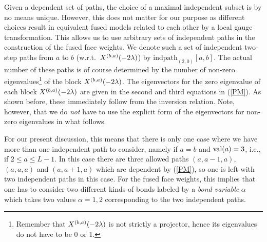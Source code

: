 Given a dependent set of paths, the choice of a maximal independent subset
is by no means unique. However, this does not matter for our purpose as
different choices result in equivalent fused models related to each other by a
local gauge transformation. This allows us to use arbitrary sets of independent
paths in the construction of the fused face weights. We denote such a set of
independent two-step paths from $a$ to $b$ (w.r.t.\ $X^{(b,a)}(-2\lambda)$)
by $\mbox{indpath}_{(2,0)}[a,b]$. The actual number of these paths is of course
determined by the number of non-zero eigenvalues\footnote{Remember that
$X^{(b,a)}(-2\lambda)$ is not strictly a projector, hence its eigenvalues do not
have to be 0 or 1.} of the  block $X^{(b,a)}(-2\lambda)$. The eigenvectors for
the zero eigenvalue of each block  $X^{(b,a)}(-2\lambda)$ are given in the second
and third equations in (\ref{PM}). As shown before, these immediately follow
from the inversion relation. Note, however, that we do {\em not} have to use
the explicit form of the eigenvectors for non-zero eigenvalues in what follows.

For our present discussion, this means that there is only one case where
we have more than one independent path to consider, namely if $a=b$ and
$\mbox{val($a$)}=3$, i.e., if \mbox{$2\leq a\leq L-1$}. In this case there are three
allowed paths $(a,a-1,a)$, $(a,a,a)$ and $(a,a+1,a)$ which are dependent by
(\ref{PM}), so one is left with two independent paths in this case. For the
fused face weights, this implies that one has to consider two different kinds
of bonds labeled by a {\em bond variable} $\alpha$ which takes two values
$\alpha=1,2$ corresponding to the two independent paths.

